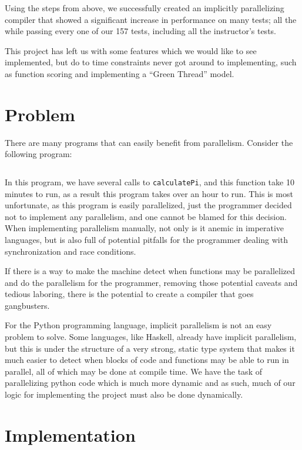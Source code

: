 \documentclass{acm_proc_article-sp}
\begin{document}
Using the steps from above, we successfully created an implicitly parallelizing compiler that
showed a significant increase in performance on many tests; all the while passing every
one of our 157 tests, including all the instructor's tests.

This project has left us with some features which we would like to see implemented, but do to
time constraints never got around to implementing, such as function scoring and implementing
a ``Green Thread'' model.

\section*{Problem}

There are many programs that can easily benefit from parallelism.
Consider the following program:

\inputminted{python}{pi.py}

In this program, we have several calls to \verb|calculatePi|, and this
function take 10 minutes to run, as a result this program takes over an hour
to run. This is most unfortunate, as this program is easily parallelized, just
the programmer decided not to implement any parallelism, and one cannot be blamed
for this decision. When implementing parallelism manually, not only is it anemic
in imperative languages, but is also full of potential pitfalls for the programmer
dealing with synchronization and race conditions.

If there is a way to make the machine detect when functions may be
parallelized and do the parallelism for the programmer, removing those potential
caveats and tedious laboring, there is the potential to create a
compiler that goes gangbusters.

For the Python programming language, implicit parallelism is not an easy
problem to solve. Some languages, like Haskell, already have implicit
parallelism, but this is under the structure of a very strong, static type
system that makes it much easier to detect when blocks of code and functions
may be able to run in parallel, all of which may be done at compile time. We
have the task of parallelizing python code which is much more dynamic and as
such, much of our logic for implementing the project must also be done
dynamically.


\section*{Implementation}
\end{document}
